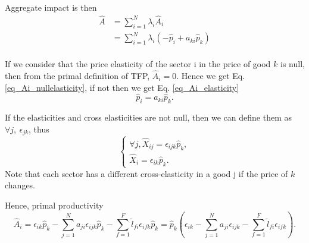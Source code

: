 \documentclass[11pt]{article}
\begin{document}
Aggregate impact is then
\begin{align*}
    \hat{A}&=\sum_{i=1}^N \lambda_i \hat{A}_i\\
    &=\sum_{i=1}^N \lambda_i (- \hat{p}_i + a_{k i} \hat{p}_{k})\\
\end{align*}



If we consider that the price elasticity of the sector i in the price of good $k$ is null, then from the primal definition of TFP, $\hat{A}_i=0$. 
Hence we get Eq. \ref{eq_Ai_nullelasticity}, if not then we get Eq. \ref{eq_Ai_elasticity}
\begin{equation}
\label{eq_Ai_nullelasticity}
     \hat{p}_i= a_{k i} \hat{p}_{k}.
\end{equation}



If the elasticities and cross elasticities are not null, then we can define them as $\forall j,~\epsilon_{jk}$, 
thus 
\begin{equation}
\begin{cases}
    \forall j, \hat{X}_{ij}=\epsilon_{ijk}\hat{p}_{k},\\
     \hat{X}_{i}=\epsilon_{ik}\hat{p}_{k}.
\end{cases}
\end{equation}
Note that each sector has a different cross-elasticity in a good j if the price of $k$ changes.

Hence, primal productivity 
\begin{equation}
\label{eq_Ai_elasticity}
    \hat{A}_i= \epsilon_{ik}\hat{p}_{k}-  \sum_{j=1}^N  a_{ji} \epsilon_{ijk}\hat{p}_{k}- \sum_{f=1}^F  \tilde{l}_{fi}\epsilon_{ifk}\hat{p}_{k}=
    \hat{p}_{k}\left(
    \epsilon_{ik}-  \sum_{j=1}^N  a_{ji} \epsilon_{ijk}- \sum_{f=1}^F  \tilde{l}_{fi}\epsilon_{ifk}
    \right).
\end{equation}
\end{document}
